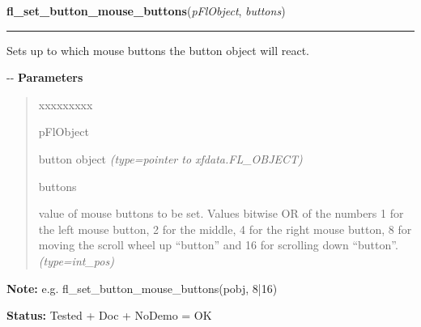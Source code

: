     \label{xformslib:flbutton:fl_set_button_mouse_buttons}

    \vspace{0.5ex}

\hspace{.8\funcindent}\begin{boxedminipage}{\funcwidth}

    \raggedright \textbf{fl\_set\_button\_mouse\_buttons}(\textit{pFlObject}, \textit{buttons})

    \vspace{-1.5ex}

    \rule{\textwidth}{0.5\fboxrule}
\setlength{\parskip}{2ex}

Sets up to which mouse buttons the button object will react.

-{}-
\setlength{\parskip}{1ex}
      \textbf{Parameters}
      \vspace{-1ex}

      \begin{quote}
        \begin{Ventry}{xxxxxxxxx}

          \item[pFlObject]


button object
            {\it (type=pointer to xfdata.FL\_OBJECT)}

          \item[buttons]


value of mouse buttons to be set. Values bitwise OR of the numbers 1
for the left mouse button, 2 for the middle, 4 for the right mouse
button, 8 for moving the scroll wheel up ``button'' and 16 for scrolling
down ``button''.
            {\it (type=int\_pos)}

        \end{Ventry}

      \end{quote}

\textbf{Note:} 
e.g. fl\_set\_button\_mouse\_buttons(pobj, 8|16)


\textbf{Status:} 
Tested + Doc + NoDemo = OK


    \end{boxedminipage}

    \label{xformslib:flbutton:fl_get_button_mouse_buttons}

